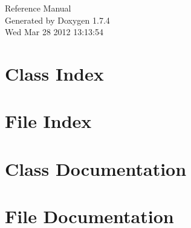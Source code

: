 \documentclass[a4paper]{book}
\begin{document}
\hypersetup{pageanchor=false}
\begin{titlepage}
\vspace*{7cm}
\begin{center}
{\Large Reference Manual}\\
\vspace*{1cm}
{\large Generated by Doxygen 1.7.4}\\
\vspace*{0.5cm}
{\small Wed Mar 28 2012 13:13:54}\\
\end{center}
\end{titlepage}
\clearemptydoublepage
{}
\tableofcontents
\clearemptydoublepage
{}
\hypersetup{pageanchor=true}
\chapter{Class Index}

\chapter{File Index}

\chapter{Class Documentation}





















\chapter{File Documentation}







\printindex
\end{document}

